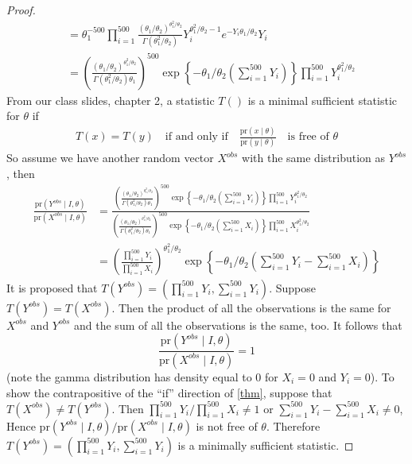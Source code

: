 \documentclass[letterpaper, 12pt]{article}
\newcommand{\pr}{\text{pr}}
\newcommand{\sbs}{\;|\;} %
\begin{document}
\begin{enumerate}[(i)]
\begin{proof}
\begin{align}
&=
\theta_1^{-500}  
\prod_{i=1}^{500} 
\frac{(\theta_1 / \theta_2)^{\theta_1^2 / \theta_2}}{\Gamma(\theta_1^2 / \theta_2)} Y_i^{\theta_1^2 / \theta_2 - 1}e^{-Y_i \theta_1/\theta_2} Y_i
\\
&=
\left(
\frac{(\theta_1 / \theta_2)^{\theta_1^2 / \theta_2}}{\Gamma(\theta_1^2 / \theta_2) \theta_1}
\right)^{500}
\exp
\left\{
-\theta_1/\theta_2
\left(
\sum_{i=1}^{500}
Y_i
\right)
\right\}
\prod_{i=1}^{500} 
Y_i^{\theta_1^2 / \theta_2 }
\end{align}
From our class slides, chapter 2, a statistic $T()$ is a minimal sufficient statistic for $\theta$ if
\begin{align}
T(x) = T(y) \quad \text{if and only if} \quad \frac{\pr(x \sbs \theta)}{\pr(y \sbs \theta)} \quad \text{is free of $\theta$}
\label{thm}
\end{align}
So assume we have another random vector $X^{obs}$ with the same distribution as $Y^{obs}$, then 
\begin{align}
\frac{\pr(Y^{obs} \sbs I, \theta)}{\pr(X^{obs} \sbs I, \theta)} 
&=
\frac
{
\left(
\frac{(\theta_1 / \theta_2)^{\theta_1^2 / \theta_2}}{\Gamma(\theta_1^2 / \theta_2) \theta_1}
\right)^{500}
\exp
\left\{
-\theta_1/\theta_2
\left(
\sum_{i=1}^{500}
Y_i
\right)
\right\}
\prod_{i=1}^{500} 
Y_i^{\theta_1^2 / \theta_2 }
}
{
\left(
\frac{(\theta_1 / \theta_2)^{\theta_1^2 / \theta_2}}{\Gamma(\theta_1^2 / \theta_2) \theta_1}
\right)^{500}
\exp
\left\{
-\theta_1/\theta_2
\left(
\sum_{i=1}^{500}
X_i
\right)
\right\}
\prod_{i=1}^{500} 
X_i^{\theta_1^2 / \theta_2 }
}
\\
&= \left( 
\frac{\prod_{i=1}^{500} Y_i}
{\prod_{i=1}^{500} X_i}
\right)^{\theta_1^2 /\theta_2} 
\exp
\left\{
-\theta_1 /\theta_2
\left(
\sum_{i=1}^{500}Y_i - \sum_{i=1}^{500}X_i
\right)
\right\}
\end{align}
It is proposed that $T(Y^{obs}) = (\prod_{i=1}^{500} Y_i, \sum_{i=1}^{500}Y_i)$. 
Suppose $T(Y^{obs})= T(X^{obs})$. 
Then the product of all the observations is the same for $X^{obs}$ and $Y^{obs}$ and the sum of all the observations is the same, too. 
It follows that 
\begin{equation}
\frac{\pr(Y^{obs} \sbs I, \theta)}{\pr(X^{obs} \sbs I, \theta)} = 1
\end{equation}
(note the gamma distribution has density equal to $0$ for $X_i = 0$ and $Y_i = 0$).
To show the contrapositive of the ``if'' direction of
\eqref{thm},
suppose 
that $T(X^{obs}) \neq T(Y^{obs})$. Then
$\prod_{i=1}^{500} Y_i/ \prod_{i=1}^{500}X_i \neq 1$ or $\sum_{i=1}^{500}Y_i - \sum_{i=1}^{500}X_i \neq 0$, Hence
$\pr(Y^{obs} \sbs I, \theta)/\pr(X^{obs} \sbs I, \theta)$ is not free of $\theta$. 
Therefore $T(Y^{obs})=(\prod_{i=1}^{500} Y_i, \sum_{i=1}^{500}Y_i)$ is a minimally sufficient statistic.
\end{proof}



\end{enumerate}
\end{document}
